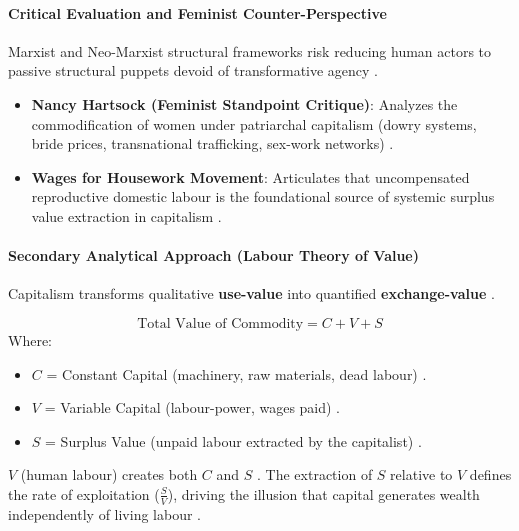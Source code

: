 \paragraph{Critical Evaluation and Feminist Counter-Perspective}
Marxist and Neo-Marxist structural frameworks risk reducing human actors to passive structural puppets devoid of transformative agency . 

\begin{itemize}
    \item \textbf{Nancy Hartsock (Feminist Standpoint Critique)}: Analyzes the commodification of women under patriarchal capitalism (dowry systems, bride prices, transnational trafficking, sex-work networks) .
    \item \textbf{Wages for Housework Movement}: Articulates that uncompensated reproductive domestic labour is the foundational source of systemic surplus value extraction in capitalism .
\end{itemize}

\paragraph{Secondary Analytical Approach (Labour Theory of Value)}
Capitalism transforms qualitative \textbf{use-value} into quantified \textbf{exchange-value} .

\begin{DataFact}
\begin{equation}
\text{Total Value of Commodity} = C + V + S
\end{equation}
Where:
\begin{itemize}
    \item $C$ = Constant Capital (machinery, raw materials, dead labour) .
    \item $V$ = Variable Capital (labour-power, wages paid) .
    \item $S$ = Surplus Value (unpaid labour extracted by the capitalist) .
\end{itemize}
$V$ (human labour) creates both $C$ and $S$ . The extraction of $S$ relative to $V$ defines the rate of exploitation ($\frac{S}{V}$), driving the illusion that capital generates wealth independently of living labour .
\end{DataFact}

